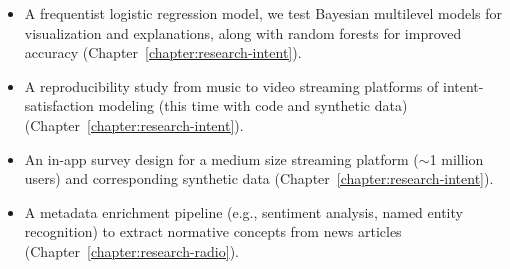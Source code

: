 \begin{itemize}
\item A frequentist logistic regression model, we test Bayesian multilevel models for visualization and explanations, along with random forests for improved accuracy (Chapter~\ref{chapter:research-intent}).
\item A reproducibility study from music to video streaming platforms of intent-satisfaction modeling (this time with code and synthetic data) (Chapter~\ref{chapter:research-intent}).
\item An in-app survey design for a medium size streaming platform ($\sim$1 million users) and corresponding synthetic data (Chapter~\ref{chapter:research-intent}).
\item A metadata enrichment pipeline (e.g., sentiment analysis, named entity recognition) to extract normative concepts from news articles (Chapter~\ref{chapter:research-radio}).
\end{itemize}
